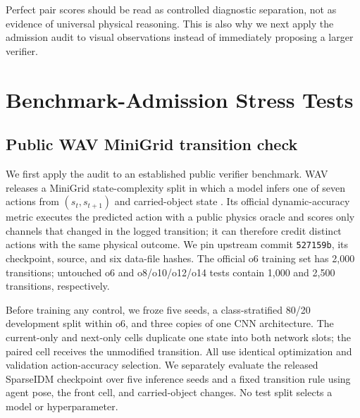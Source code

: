 \documentclass[letterpaper,10pt,conference]{ieeeconf}
\begin{document}
Perfect pair scores should be read as controlled diagnostic separation, not as
evidence of universal physical reasoning. This is also why we next apply the
admission audit to visual observations instead of immediately proposing a
larger verifier.

\section{Benchmark-Admission Stress Tests}

\subsection{Public WAV MiniGrid transition check}

We first apply the audit to an established public verifier benchmark. WAV
releases a MiniGrid state-complexity split in which a model infers one of seven
actions from $(s_t,s_{t+1})$ and carried-object state \cite{liu2026wav}. Its
official dynamic-accuracy metric executes the predicted action with a public
physics oracle and scores only channels that changed in the logged transition;
it can therefore credit distinct actions with the same physical outcome. We
pin upstream commit \texttt{527159b}, its checkpoint, source, and six data-file
hashes. The official o6 training set has 2,000 transitions; untouched o6 and
o8/o10/o12/o14 tests contain 1,000 and 2,500 transitions, respectively.

Before training any control, we froze five seeds, a class-stratified 80/20
development split within o6, and three copies of one CNN architecture. The
current-only and next-only cells duplicate one state into both network slots;
the paired cell receives the unmodified transition. All use identical
optimization and validation action-accuracy selection. We separately evaluate
the released SparseIDM checkpoint over five inference seeds and a fixed
transition rule using agent pose, the front cell, and carried-object changes.
No test split selects a model or hyperparameter.

\begin{table}[t]
    \centering
    \caption{External audit of the public WAV MiniGrid state-complexity split.
    Entries are official dynamic accuracy; learned cells and SparseIDM report
    mean$\pm$sample standard deviation over five seeds. ``Strongest single'' is
    the larger of the separately evaluated current-only and next-only means at
    each complexity. The transition rule has 1.000 action accuracy; its
    subunit dynamic score exposes the public oracle/log mismatch and is treated
    as an observed ceiling, not used to normalize other scores.}
    \label{tab:wav}
    \resizebox{0.94\textwidth}{!}{}
\end{table}
\end{document}
